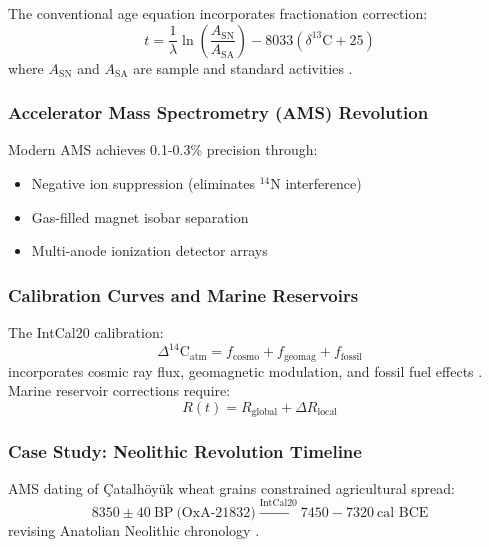 \documentclass{article}
\begin{document}
The conventional age equation incorporates fractionation correction:
\begin{equation}
    t = \frac{1}{\lambda} \ln\left(\frac{A_{\text{SN}}}{A_{\text{SA}}}\right) - 8033 \left(\delta^{13}\text{C} + 25\right)
    \label{eq:c14_age}
\end{equation}
where \(A_{\text{SN}}\) and \(A_{\text{SA}}\) are sample and standard activities \cite{Stuiver1977}.

\subsubsection*{Accelerator Mass Spectrometry (AMS) Revolution}
Modern AMS achieves 0.1-0.3\% precision through:
\begin{itemize}
    \item Negative ion suppression (eliminates \(^{14}\text{N}\) interference)
    \item Gas-filled magnet isobar separation
    \item Multi-anode ionization detector arrays
\end{itemize}

\subsubsection*{Calibration Curves and Marine Reservoirs}
The IntCal20 calibration:
\begin{equation}
    \Delta^{14}\text{C}_{\text{atm}} = f_{\text{cosmo}} + f_{\text{geomag}} + f_{\text{fossil}}
    \label{eq:intcal}
\end{equation}
incorporates cosmic ray flux, geomagnetic modulation, and fossil fuel effects \cite{Reimer2020}. Marine reservoir corrections require:
\begin{equation}
    R(t) = R_{\text{global}} + \Delta R_{\text{local}}
    \label{eq:marine_reservoir}
\end{equation}

\subsubsection*{Case Study: Neolithic Revolution Timeline}
AMS dating of Çatalhöyük wheat grains constrained agricultural spread:
\begin{equation}
    8350 \pm 40\ \text{BP}\ \text{(OxA-21832)} \xrightarrow{\text{IntCal20}} 7450-7320\ \text{cal BCE}
    \label{eq:catalhoyuk}
\end{equation}
revising Anatolian Neolithic chronology \cite{Tanno2022}.
\end{document}
